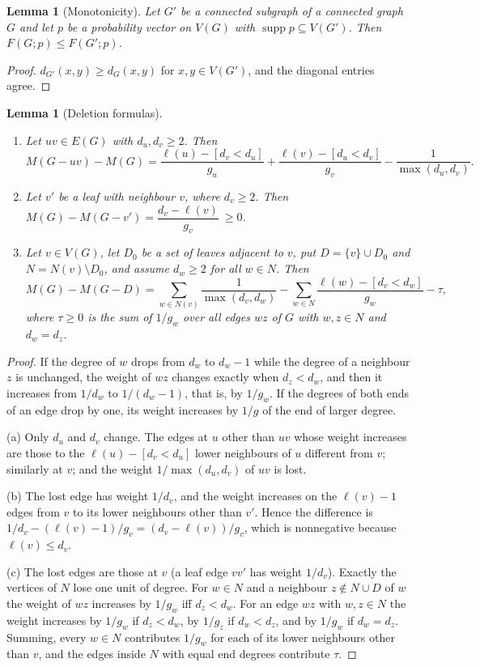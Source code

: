 \documentclass[11pt,a4paper]{article}
\newtheorem{lemma}[theorem]{Lemma}
\theoremstyle{definition}
\theoremstyle{remark}
\numberwithin{equation}{section}
\newcommand{\supp}{\operatorname{supp}}
\begin{document}
\begin{lemma}[Monotonicity]\label{lem:mono}
Let $G'$ be a connected subgraph of a connected graph $G$ and let $p$ be a
probability vector on $V(G)$ with $\supp p\subseteq V(G')$. Then
$F(G;p)\le F(G';p)$.
\end{lemma}
\begin{proof}
$d_{G'}(x,y)\ge d_G(x,y)$ for $x,y\in V(G')$, and the diagonal entries agree.
\end{proof}

\begin{lemma}[Deletion formulas]\label{lem:del}
\begin{enumerate}[label=(\alph*)]
\item Let $uv\in E(G)$ with $d_u,d_v\ge2$. Then
\[
 M(G-uv)-M(G)=\frac{\ell(u)-[d_v<d_u]}{g_u}+\frac{\ell(v)-[d_u<d_v]}{g_v}
 -\frac1{\max(d_u,d_v)} .
\]
\item Let $v'$ be a leaf with neighbour $v$, where $d_v\ge2$. Then
$M(G)-M(G-v')=\dfrac{d_v-\ell(v)}{g_v}\ \ge0$.
\item Let $v\in V(G)$, let $D_0$ be a set of leaves adjacent to $v$, put
$D=\{v\}\cup D_0$ and $N=N(v)\setminus D_0$, and assume $d_w\ge2$ for all $w\in N$.
Then
\[
 M(G)-M(G-D)=\sum_{w\in N(v)}\frac1{\max(d_v,d_w)}
 -\sum_{w\in N}\frac{\ell(w)-[d_v<d_w]}{g_w}-\tau,
\]
where $\tau\ge0$ is the sum of $1/g_w$ over all edges $wz$ of $G$ with $w,z\in N$
and $d_w=d_z$.
\end{enumerate}
\end{lemma}
\begin{proof}
If the degree of $w$ drops from $d_w$ to $d_w-1$ while the degree of a neighbour
$z$ is unchanged, the weight of $wz$ changes exactly when $d_z<d_w$, and then it
increases from $1/d_w$ to $1/(d_w-1)$, that is, by $1/g_w$. If the degrees of both
ends of an edge drop by one, its weight increases by $1/g$ of the end of larger
degree.

(a) Only $d_u$ and $d_v$ change. The edges at $u$ other than $uv$ whose weight
increases are those to the $\ell(u)-[d_v<d_u]$ lower neighbours of $u$ different
from $v$; similarly at $v$; and the weight $1/\max(d_u,d_v)$ of $uv$ is lost.

(b) The lost edge has weight $1/d_v$, and the weight increases on the $\ell(v)-1$
edges from $v$ to its lower neighbours other than $v'$. Hence the difference is
$1/d_v-(\ell(v)-1)/g_v=(d_v-\ell(v))/g_v$, which is nonnegative because
$\ell(v)\le d_v$.

(c) The lost edges are those at $v$ (a leaf edge $vv'$ has weight $1/d_v$). Exactly
the vertices of $N$ lose one unit of degree. For $w\in N$ and a neighbour
$z\notin N\cup D$ of $w$ the weight of $wz$ increases by $1/g_w$ iff $d_z<d_w$.
For an edge $wz$ with $w,z\in N$ the weight increases by $1/g_w$ if $d_z<d_w$,
by $1/g_z$ if $d_w<d_z$, and by $1/g_w$ if $d_w=d_z$. Summing, every $w\in N$
contributes $1/g_w$ for each of its lower neighbours other than $v$, and the edges
inside $N$ with equal end degrees contribute $\tau$.
\end{proof}
\end{document}
